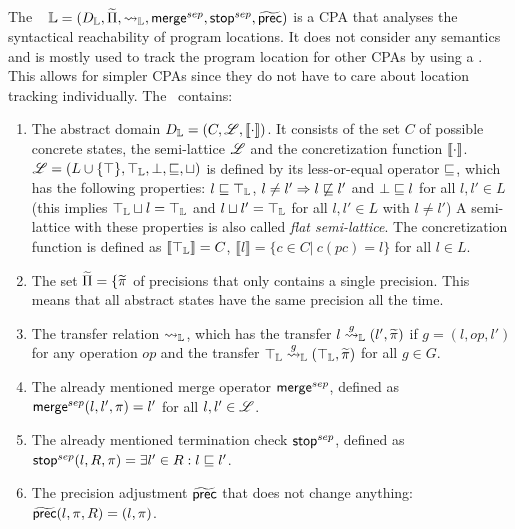 \subsection{\LocationCPA}
The \locationCPA\ \cite{BeyerBook} \cite{Beyer2008} $\mathbb{L} = (D_{\mathbb{L}}, {\widetilde{\Pi}}, \rightsquigarrow_{\mathbb{L}}, \operatorname{\operatorname{\mathsf{merge}}}^{sep}, \operatorname{\operatorname{\mathsf{stop}}}^{sep}, \operatorname{\widetilde{\operatorname{\operatorname{\mathsf{prec}}}}})$ is a CPA that analyses the syntactical reachability of program locations.
It does not consider any semantics and is mostly used to track the program location for other CPAs by using a \compositeCPA.
This allows for simpler CPAs since they do not have to care about location tracking individually.
The \locationCPA\ contains:
\begin{enumerate}[leftmargin=*, label=\arabic*.]
\item
The abstract domain $D_{\mathbb{L}} = (C, \mathscr{L}, \llbracket \cdot \rrbracket)$. It consists of the set  $C$ of possible concrete states, the semi-lattice $\mathscr{L}$ and the concretization function $\llbracket \cdot \rrbracket$.
	$\mathscr{L} = (L \cup \{\top\}, \top_{\mathbb{L}}, \bot, \sqsubseteq, \sqcup)$ is defined by its less-or-equal operator $\sqsubseteq$, which has the following properties:
	$l \sqsubseteq \top_{\mathbb{L}}$, $l \neq l' \Rightarrow l \not\sqsubseteq l'$ and $\bot \sqsubseteq l$ for all $l, l' \in L$
	(this implies $\top_{\mathbb{L}} \sqcup l = \top_{\mathbb{L}}$ and $l \sqcup l' = \top_{\mathbb{L}}$ for all $l, l' \in L$ with $l \neq l'$) A semi-lattice with 	these properties is also called \emph{flat semi-lattice}.
	The concretization function is defined as $\llbracket \top_{\mathbb{L}} \rrbracket = C$, $\llbracket l \rrbracket = \{ c \in C |\ c(pc) = l\}$ for all $l \in L$.

\item
The set ${\widetilde{\Pi}} = \{ {\widetilde{\pi}}$ of precisions that only contains a single precision. This means that all abstract states have the same precision all the time.

\item
The transfer relation $\rightsquigarrow_{\mathbb{L}}$, which has the transfer $l \overset{g}{\rightsquigarrow}_{\mathbb{L}} (l', {\widetilde{\pi}})$ if $g = (l, op, l')$ for any operation $op$
	and the transfer $\top_{\mathbb{L}} \overset{g}{\rightsquigarrow}_{\mathbb{L}} (\top_{\mathbb{L}}, {\widetilde{\pi}})$ for all $g \in G$.

\item
The already mentioned merge operator $\operatorname{\operatorname{\mathsf{merge}}}^{sep}$, defined as $\operatorname{\operatorname{\mathsf{merge}}}^{sep}(l, l', \pi) = l'$ for all $l, l' \in \mathscr{L}$.

\item 
The already mentioned termination check $\operatorname{\operatorname{\mathsf{stop}}}^{sep}$, defined as $\operatorname{\operatorname{\mathsf{stop}}}^{sep}(l, R, \pi) = \exists l' \in R : l \sqsubseteq l'$.

\item
The precision adjustment $\operatorname{\widetilde{\operatorname{\operatorname{\mathsf{prec}}}}}$ that does not change anything: $\operatorname{\widetilde{\operatorname{\operatorname{\mathsf{prec}}}}}(l, \pi, R) = (l, \pi)$.
\end{enumerate}


